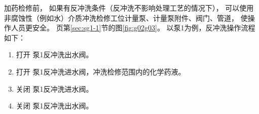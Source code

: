 
加药检修前，
如果有反冲洗条件（反冲洗不影响处理工艺的情况下），
可以使用非腐蚀性（例如水）介质冲洗检修工位计量泵、计量泵附件、阀门、管道，
使操作人员更安全。
\pageref{sec:sg1-1}页第\ref{sec:sg1-1}节的图\ref{fig:g02g03}。
以泵1为例，反冲洗操作流程如下：
\begin{enumerate}
    \item 打开 泵1反冲洗出水阀。
    \item 打开 泵1反冲洗进水阀，冲洗检修范围内的化学药液。
    \item 关闭 泵1反冲洗进水阀。
    \item 关闭 泵1反冲洗出水阀。
\end{enumerate}

